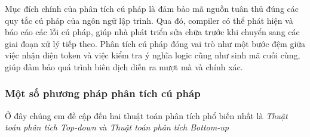 





\vspace{1cm}

Mục đích chính của phân tích cú pháp là đảm bảo mã nguồn tuân thủ đúng các quy tắc cú pháp của ngôn ngữ lập trình. Qua đó, compiler có thể phát hiện và báo cáo các lỗi cú pháp, giúp nhà phát triển sửa chữa trước khi chuyển sang các giai đoạn xử lý tiếp theo. Phân tích cú pháp đóng vai trò như một bước đệm giữa việc nhận diện token và việc kiểm tra ý nghĩa logic cũng như sinh mã cuối cùng, giúp đảm bảo quá trình biên dịch diễn ra mượt mà và chính xác.
\subsubsection{Một số phương pháp phân tích cú pháp}
Ở đây chúng em đề cập đến hai thuật toán phân tích phổ biến nhất là \textit{Thuật toán phân tích Top-down} và \textit{Thuật toán phân tích Bottom-up}

